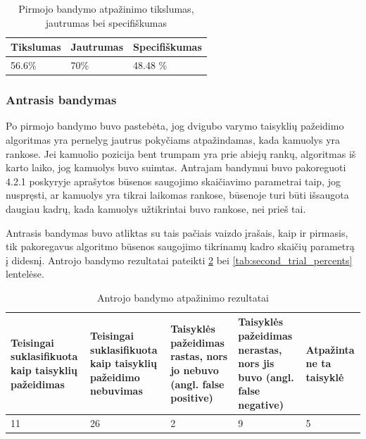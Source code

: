 \documentclass{VUMIFPSbakalaurinis}
\begin{document}
 \begin{table}[H]\footnotesize
	\centering
	\caption{Pirmojo bandymo atpažinimo tikslumas, jautrumas bei specifiškumas}
	{\begin{tabular}{|p{5cm}|p{5cm}|p{5cm}|} \hline
			\textbf{Tikslumas} & \textbf{Jautrumas} & \textbf{Specifiškumas} \\
			\hline
			56.6\%  & 70\%    & 48.48 \%    \\
			
			\hline
	\end{tabular}}
	\label{tab:first_trial_percents}
\end{table}

\subsubsection{Antrasis bandymas}

Po pirmojo bandymo buvo pastebėta, jog dvigubo varymo taisyklių pažeidimo algoritmas yra pernelyg jautrus pokyčiams atpažindamas, kada kamuolys yra rankose. Jei kamuolio pozicija bent trumpam yra prie abiejų rankų, algoritmas iš karto laiko, jog kamuolys buvo suimtas. Antrajam bandymui buvo pakoreguoti 4.2.1 poskyryje aprašytos būsenos saugojimo skaičiavimo parametrai taip, jog nuspręsti, ar kamuolys yra tikrai laikomas rankose, būsenoje turi būti išsaugota daugiau kadrų, kada kamuolys užtikrintai buvo rankose, nei prieš tai.

Antrasis bandymas buvo atliktas su tais pačiais vaizdo įrašais, kaip ir pirmasis, tik pakoregavus algoritmo būsenos saugojimo tikrinamų kadro skaičių parametrą į didesnį. Antrojo bandymo rezultatai pateikti  \ref{tab:second_trial} bei \ref{tab:second_trial_percents} lentelėse.

\begin{table}[H]\footnotesize
	\centering
	\caption{Antrojo bandymo atpažinimo rezultatai}
	{\begin{tabular}{|p{3cm}|p{3cm}|p{3cm}|p{3cm}|p{2cm}|} \hline
			\textbf{Teisingai suklasifikuota kaip taisyklių pažeidimas} & \textbf{Teisingai suklasifikuota kaip taisyklių pažeidimo nebuvimas} & \textbf{Taisyklės pažeidimas rastas, nors jo nebuvo (angl. false positive)} & \textbf{Taisyklės pažeidimas nerastas, nors jis buvo (angl. false negative)} & \textbf{Atpažinta ne ta taisyklė} \\
			\hline
			11  & 26    & 2    & 9    & 5   \\
			\hline
	\end{tabular}}
	\label{tab:second_trial}
\end{table}
\end{document}
